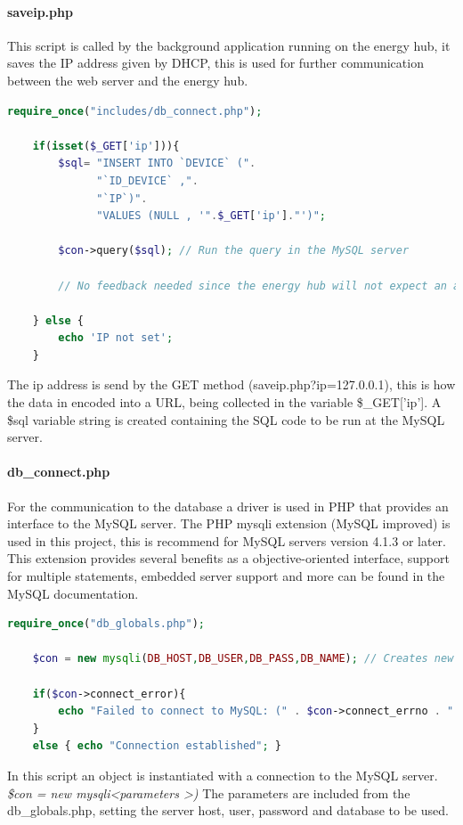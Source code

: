 \paragraph{saveip.php}

This script is called by the background application running on the energy hub, it saves the IP address given by DHCP, this is used for further communication between the web server and the energy hub.
\begin{lstlisting}[language=php]
	require_once("includes/db_connect.php");

	if(isset($_GET['ip'])){
		$sql= "INSERT INTO `DEVICE` (".
			  "`ID_DEVICE` ,".
		  	  "`IP`)".
		  	  "VALUES (NULL , '".$_GET['ip']."')";
	
		$con->query($sql); // Run the query in the MySQL server
		
		// No feedback needed since the energy hub will not expect an answer.
		
	} else {
		echo 'IP not set';
	}
\end{lstlisting}
The ip address is send by the GET method (saveip.php?ip=127.0.0.1), this is how the data in encoded into a URL, being collected in the variable \$\_GET['ip']. 
A \$sql variable string is created containing the SQL code to be run at the MySQL server.

\paragraph{db\_connect.php}

For the communication to the database a driver is used in PHP that provides an interface to the MySQL server. The PHP mysqli extension (MySQL improved) is used in this project, this is recommend for MySQL servers version 4.1.3 or later. This extension provides several benefits as a objective-oriented interface, support for multiple statements, embedded server support and more can be found in the MySQL documentation.

\begin{lstlisting}[language=php]
	require_once("db_globals.php");
	
	$con = new mysqli(DB_HOST,DB_USER,DB_PASS,DB_NAME); // Creates new mysql connection
	
	if($con->connect_error){
		echo "Failed to connect to MySQL: (" . $con->connect_errno . " ) ". $con->connect_error;
	} 
	else { echo "Connection established"; }
\end{lstlisting}

In this script an object is instantiated with a connection to the MySQL server.
\p
\textit{\$con = new mysqli\textless parameters \textgreater)}
\p
The parameters are included from the db\_globals.php, setting the server host, user, password and database to be used.

